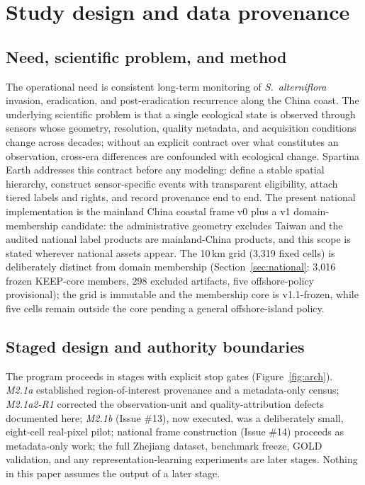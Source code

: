 \section{Study design and data provenance}\label{sec:design}

\subsection{Need, scientific problem, and method}
The operational need is consistent long-term monitoring of
\emph{S.~alterniflora} invasion, eradication, and post-eradication
recurrence along the China coast. The underlying scientific problem is
that a single ecological state is observed through sensors whose
geometry, resolution, quality metadata, and acquisition conditions
change across decades; without an explicit contract over what
constitutes an observation, cross-era differences are confounded with
ecological change. Spartina Earth addresses this contract before any
modeling: define a stable spatial hierarchy, construct sensor-specific
events with transparent eligibility, attach tiered labels and rights,
and record provenance end to end. The present national
implementation is the mainland China coastal frame v0 plus a v1
domain-membership candidate: the administrative geometry excludes
Taiwan and the audited national label products are mainland-China
products, and this scope is stated wherever national assets appear.
The 10\,km grid (3{,}319 fixed cells) is deliberately distinct from
domain membership (Section~\ref{sec:national}: 3{,}016 frozen KEEP-core
members, 298 excluded artifacts, five offshore-policy provisional);
the grid is immutable and the membership core is v1.1-frozen, while five
cells remain outside the core pending a general offshore-island policy.

\subsection{Staged design and authority boundaries}
The program proceeds in stages with explicit stop gates (Figure~\ref{fig:arch}).
\emph{M2.1a} established region-of-interest provenance and a
metadata-only census; \emph{M2.1a2-R1} corrected the observation-unit
and quality-attribution defects documented here; \emph{M2.1b} (Issue
\#13), now executed, was a deliberately small, eight-cell real-pixel
pilot; national
frame construction (Issue \#14) proceeds as metadata-only work; the
full Zhejiang dataset, benchmark freeze, GOLD validation, and any
representation-learning experiments are later stages. Nothing in this
paper assumes the output of a later stage.

